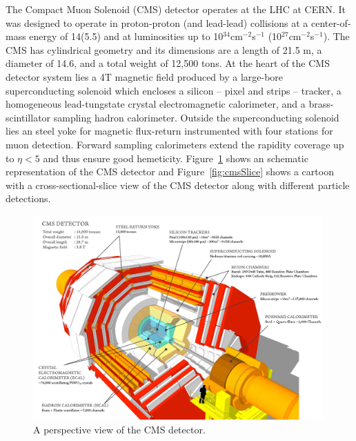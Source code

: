The Compact Muon Solenoid (CMS) detector operates at the LHC at CERN. It was designed to operate in proton-proton (and lead-lead)
collisions at a center-of-mass energy of 14\TeV (5.5\TeV) and at
luminosities up to 10$^{34}$cm$^{-2}$s$^{-1}$
(10$^{27}$cm$^{-2}$s$^{-1}$). The CMS has cylindrical geometry and
its dimensions are a length of 21.5 m, a diameter of 14.6, and a total
weight of 12,500 tons. At the heart of the CMS detector system
lies a 4\unit{T} magnetic field produced by a large-bore superconducting
solenoid which encloses a silicon -- pixel and strips -- tracker, a homogeneous
lead-tungstate crystal electromagnetic calorimeter, and a brass-scintillator
sampling hadron calorimeter. Outside the superconducting solenoid lies
an steel yoke for magnetic flux-return instrumented with four stations
for muon detection. Forward sampling calorimeters extend the rapidity
coverage up to $\eta < 5$ and thus ensure good
hemeticity. Figure~\ref{fig:cmsDetector} shows an schematic representation
of the CMS detector and Figure~\ref{fig:cmsSlice} shows a cartoon
with a cross-sectional-slice view of the CMS detector along with
different particle detections.
\begin{figure}
 \centering
\includegraphics[width=0.99\textwidth]{CMS_DetectorFigures/cms_detector.png}
 \caption{A perspective view of the CMS detector.\label{fig:cmsDetector}}
\end{figure}
